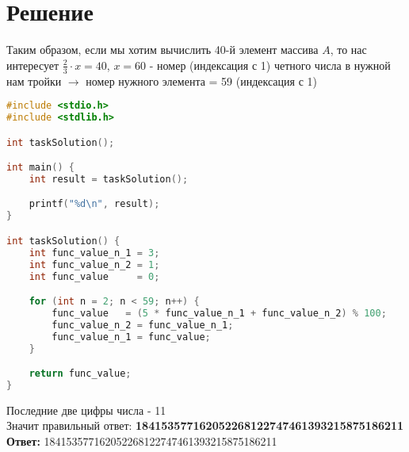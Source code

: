 \documentclass{article}
\begin{document}
\section*{Решение}
Таким образом, если мы хотим вычислить 40-й элемент массива $A$, то нас интересует $\frac{2}{3} \cdot x = 40$, $x = 60$ - номер (индексация с 1) четного числа в нужной нам тройки $\rightarrow$ номер нужного элемента = 59 (индексация с 1)\\

\begin{lstlisting}[language=C]
#include <stdio.h>
#include <stdlib.h>

int taskSolution();

int main() {
    int result = taskSolution();

    printf("%d\n", result);
}

int taskSolution() {
    int func_value_n_1 = 3;
    int func_value_n_2 = 1;
    int func_value     = 0;

    for (int n = 2; n < 59; n++) {
        func_value   = (5 * func_value_n_1 + func_value_n_2) % 100;
        func_value_n_2 = func_value_n_1;
        func_value_n_1 = func_value;
    }

    return func_value;
}
\end{lstlisting}
Последние две цифры числа - 11\\
Значит правильный ответ: \textbf{184153577162052268122747461393215875186211}\\
\textbf{Ответ:} 184153577162052268122747461393215875186211
\end{document}
